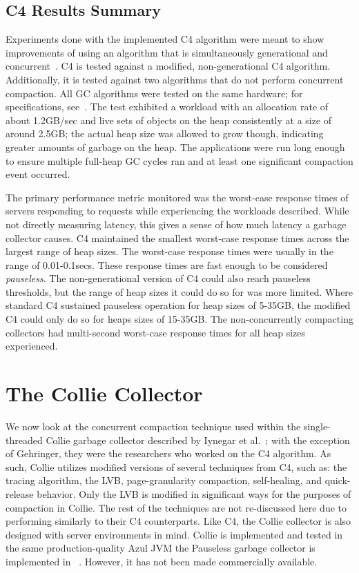 \documentclass{sig-alternate}
\begin{document}
\subsection{C4 Results Summary}
\label{sec:c4Results}


Experiments done with the implemented C4 algorithm were meant to show improvements
of using an algorithm that is simultaneously generational and concurrent~\cite{Tene:C4}.
C4 is tested against a modified, non-generational C4 algorithm. Additionally,
it is tested against two algorithms that do not perform concurrent compaction. 
All GC algorithms were tested on the same hardware; for specifications, see~\cite{Tene:C4}. 
The test exhibited a workload with
an allocation rate of about 1.2GB/sec and live sets of objects on 
the heap consistently at a size of around 2.5GB; the actual heap size was allowed 
to grow though, indicating greater amounts of garbage on the heap. The applications were run long
enough to ensure multiple full-heap GC cycles ran and at least one
significant compaction event occurred.

The primary performance metric monitored was the worst-case response times
of servers responding to requests while experiencing the workloads
described. While not directly measuring latency, this gives a sense of how 
much latency a garbage collector causes. 
C4 maintained the smallest 
worst-case response times across the largest range of heap sizes.
The worst-case response times were usually in the range of 0.01-0.1secs. 
These response times are fast enough to be considered \emph{pauseless}. 
The non-generational version of C4 could also reach pauseless thresholds,
but the range of heap sizes it could do so for was more limited. Where standard
C4 sustained pauseless operation for heap sizes of 5-35GB, the modified C4 could
only do so for heaps sizes of 15-35GB. The non-concurrently compacting
collectors had multi-second worst-case response times for all heap sizes experienced.


\section{The Collie Collector}
\label{sec:collie}

We now look at the concurrent compaction technique used within the single-threaded
Collie garbage collector described by Iynegar et al.~\cite{Iyengar:Collie};
with the exception of Gehringer, they were the researchers who worked on the C4 algorithm.
As such, Collie utilizes modified versions of several techniques from C4, such as:
the tracing algorithm, the LVB, page-granularity compaction, self-healing, and quick-release behavior.
Only the LVB is modified in significant ways for the purposes of compaction in Collie.
The rest of the techniques are not re-discussed here due to performing 
similarly to their C4 counterparts. Like C4, the Collie
collector is also designed with server environments in mind. 
Collie is implemented and tested in 
the same production-quality Azul JVM the Pauseless garbage collector is implemented in
~\cite{Click:Pauseless}. However, it has not been made commercially available.
\end{document}
